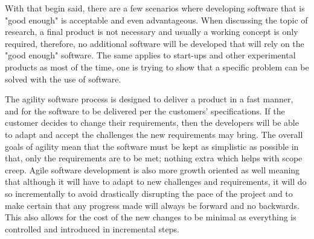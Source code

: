 	With that begin said, there are a few scenarios where developing software that is "good enough" is acceptable and even advantageous. When discussing the topic of research, a final product is not necessary and usually a working concept is only required, therefore, no additional software will be developed that will rely on the "good enough" software. The same applies to start-ups and other experimental products as most of the time, one is trying to show that a specific problem can be solved with the use of software.


	The agility software process is designed to deliver a product in a fast manner, and for the software to be delivered per the customers' specifications. If the customer decides to change their requirements, then the developers will be able to adapt and accept the challenges the new requirements may bring. The overall goals of agility mean that the software must be kept as simplistic as possible in that, only the requirements are to be met; nothing extra which helps with scope creep. Agile software development is also more growth oriented as well meaning that although it will have to adapt to new challenges and requirements, it will do so incrementally to avoid drastically disrupting the pace of the project and to make certain that any progress made will always be forward and no backwards. This also allows for the cost of the new changes to be minimal as everything is controlled and introduced in incremental steps.

